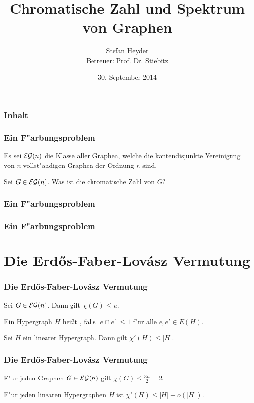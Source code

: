 \documentclass{beamer}
\title[Chrom. Zahl und Spektrum von Graphen]{Chromatische Zahl und Spektrum von Graphen}
\author[Stefan Heyder]{Stefan Heyder \\ Betreuer: Prof. Dr. Stiebitz}
\institute{TU Ilmenau}
\date{30. September 2014}
\begin{document}
\begin{frame}[<+->]
  \titlepage
\end{frame}

\begin{frame}[<+->]
  \frametitle{Inhalt} 
  \tableofcontents 
\end{frame}

\begin{frame}[<+->]
  \frametitle{Ein F"arbungsproblem}
  Es sei ${\cal EG}(n)$ die Klasse aller Graphen, welche die kantendisjunkte Vereinigung von $n$ vollst"andigen Graphen der Ordnung $n$ sind.
  \pause
  \begin{problem}
    Sei $G\in {\cal EG}(n)$. Was ist die chromatische Zahl von $G$?
  \end{problem}
\end{frame}
\begin{frame}
  \frametitle{Ein F"arbungsproblem}
  
\end{frame}
\begin{frame}
  \frametitle{Ein F"arbungsproblem}
  
\end{frame}

\section{Die Erd\H os-Faber-Lov\'asz Vermutung}

\begin{frame}[<+->]
  \frametitle{Die Erd\H{o}s-Faber-Lov\'asz Vermutung}
  \begin{conjecture}
    Sei $G\in{\cal EG}(n)$. Dann gilt $\chi(G) \leq n$.
  \end{conjecture}
   {Ein Hypergraph $H$ hei{\ss}t , falls $|e\cap e'| \leq 1$ f"ur alle $e,e'\in E(H)$. }
   {
    \begin{conjecture}
      Sei $H$ ein linearer Hypergraph. Dann gilt $\chi'(H) \leq |H|$.
    \end{conjecture} 
  }
\end{frame}

\begin{frame}[<+->]
  \frametitle{Die Erd\H{o}s-Faber-Lov\'asz Vermutung}
  \begin{proposition}
    F"ur jeden Graphen $G\in {\cal EG}(n)$ gilt $\chi(G) \leq \frac{3n}{2} -2$.
  \end{proposition}
  \begin{proposition}[Kahn]
    F"ur jeden linearen Hypergraphen $H$ ist $\chi'(H) \leq |H| + o(|H|)$.
  \end{proposition}
\end{frame}
\end{document}
